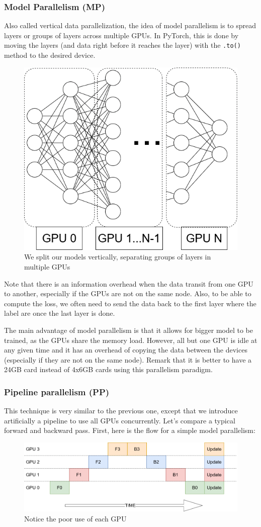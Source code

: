\documentclass{article}
\begin{document}
\subsubsection{Model Parallelism (MP)}
Also called vertical data parallelization, the idea of model parallelism is to spread layers or groups of layers across multiple GPUs. In PyTorch, this is done by moving the layers (and data right before it reaches the layer) with the \lstinline{.to()} method to the desired device.
\begin{figure}[h!]
  \center
  \includegraphics[width=0.5\linewidth]{images/2022-08-24-18-23-26.png}
  \caption{We split our models vertically, separating groups of layers in multiple GPUs}
\end{figure}
\FloatBarrier
Note that there is an information overhead when the data transit from one GPU to another, especially if the GPUs are not on the same node. Also, to be able to compute the loss, we often need to send the data back to the first layer where the label are once the last layer is done.

The main advantage of model parallelism is that it allows for bigger model to be trained, as the GPUs share the memory load. However, all but one GPU is idle at any given time and it has an overhead of copying the data between the devices (especially if they are not on the same node). Remark that it is better to have a 24GB card instead of 4x6GB cards using this parallelism paradigm.

\subsubsection{Pipeline parallelism (PP)}
This technique is very similar to the previous one, except that we introduce artificially a pipeline to use all GPUs concurrently. Let's compare a typical forward and backward pass. First, here is the flow for a simple model parallelism:

\begin{figure}[h!]
  \center
  \includegraphics[width=0.7\linewidth]{images/2022-08-25-09-22-17.png}
  \caption{Notice the poor use of each GPU}
\end{figure}
\FloatBarrier
\end{document}
